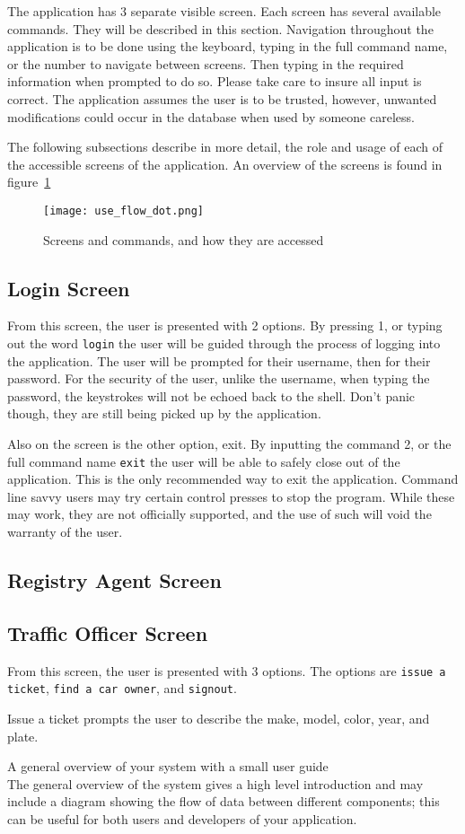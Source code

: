 The application has 3 separate visible screen. Each screen has several
available commands. They will be described in this section. Navigation
throughout the application is to be done using the keyboard, typing in the full
command name, or the number to navigate between screens. Then typing in the
required information when prompted to do so. Please take care to insure all
input is correct. The application assumes the user is to be trusted, however,
unwanted modifications could occur in the database when used by someone
careless.

The following subsections describe in more detail, the role and usage of each
of the accessible screens of the application. An overview of the screens is found in figure~\ref{fig:use_flow}

\begin{figure}
    \centering
    \texttt{[image: use\_flow\_dot.png]}
    \caption{Screens and commands, and how they are accessed}\label{fig:use_flow}
\end{figure}

\subsection{Login Screen}

From this screen, the user is presented with 2 options. By pressing 1, or
typing out the word \verb|login| the user will be guided through the process of
logging into the application. The user will be prompted for their username,
then for their password. For the security of the user, unlike the username,
when typing the password, the keystrokes will not be echoed back to the shell.
Don't panic though, they are still being picked up by the application.

Also on the screen is the other option, exit. By inputting the command 2, or
the full command name \verb|exit| the user will be able to safely close out of
the application. This is the only recommended way to exit the application.
Command line savvy users may try certain control presses to stop the program.
While these may work, they are not officially supported, and the use of such
will void the warranty of the user.

\subsection{Registry Agent Screen}


\subsection{Traffic Officer Screen}

From this screen, the user is presented with 3 options. The options are
\verb|issue a ticket|, \verb|find a car owner|, and \verb|signout|.

Issue a ticket prompts the user to describe the make, model, color, year, and plate.

A general overview of your system with a small user guide\\
The general overview of the system gives a high level introduction and may include a diagram showing the flow of data between different components; this can be useful for both users and developers of your application.
